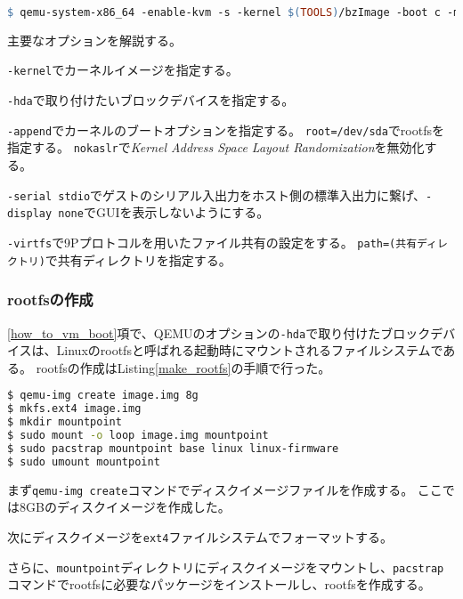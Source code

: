 \documentclass[main]{subfiles}
\begin{document}
\begin{lstlisting}[label=qemu_option,caption=QEMUのオプション,language=make]
$ qemu-system-x86_64 -enable-kvm -s -kernel $(TOOLS)/bzImage -boot c -m 2049M -hda $(TOOLS)/image.img -append "root=/dev/sda rw console=ttyS0,115200 acpi=off nokaslr" -serial stdio -display none -virtfs local,path=$(SHARE),security_model=none,mount_tag=share --no-reboot
\end{lstlisting}

主要なオプションを解説する。

\texttt{-kernel}でカーネルイメージを指定する。

\texttt{-hda}で取り付けたいブロックデバイスを指定する。

\texttt{-append}でカーネルのブートオプションを指定する。
\texttt{root=/dev/sda}でrootfsを指定する。
\texttt{nokaslr}で\textit{Kernel Address Space Layout Randomization}を無効化する。

\texttt{-serial stdio}でゲストのシリアル入出力をホスト側の標準入出力に繋げ、\texttt{-display none}でGUIを表示しないようにする。

\texttt{-virtfs}で9Pプロトコルを用いたファイル共有の設定をする。
\texttt{path=(共有ディレクトリ)}で共有ディレクトリを指定する。

\subsubsection{rootfsの作成}

\ref{how_to_vm_boot}項で、QEMUのオプションの\texttt{-hda}で取り付けたブロックデバイスは、Linuxのrootfsと呼ばれる起動時にマウントされるファイルシステムである。
rootfsの作成はListing\ref{make_rootfs}の手順で行った。

\begin{lstlisting}[language=sh,label=make_rootfs,caption=rootfsの作成]
$ qemu-img create image.img 8g
$ mkfs.ext4 image.img
$ mkdir mountpoint
$ sudo mount -o loop image.img mountpoint
$ sudo pacstrap mountpoint base linux linux-firmware
$ sudo umount mountpoint
\end{lstlisting}

まず\texttt{qemu-img create}コマンドでディスクイメージファイルを作成する。
ここでは8GBのディスクイメージを作成した。

次にディスクイメージを\texttt{ext4}ファイルシステムでフォーマットする。

さらに、\texttt{mountpoint}ディレクトリにディスクイメージをマウントし、\texttt{pacstrap}コマンドでrootfsに必要なパッケージをインストールし、rootfsを作成する。
\end{document}
